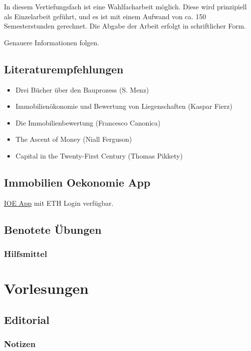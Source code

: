\documentclass[11pt]{article}
\begin{document}
In diesem Vertiefungsfach ist eine Wahlfacharbeit möglich. Diese wird
prinzipiell als Einzelarbeit geführt, und es ist mit einem Aufwand von
ca. 150 Semesterstunden gerechnet. Die Abgabe der Arbeit erfolgt in
schriftlicher Form.

Genauere Informationen folgen.

\subsection{Literaturempfehlungen}
\label{sec-1-3}

\begin{itemize}
\item Drei Bücher über den Bauprozess (S. Menz)
\item Immobilienökonomie und Bewertung von Liegenschaften (Kaspar Fierz)
\item Die Immobilienbewertung (Francesco Canonica)
\item The Ascent of Money (Niall Ferguson)
\item Capital in the Twenty-First Century (Thomas Pikkety)
\end{itemize}

\subsection{Immobilien Oekonomie App}
\label{sec-1-4}

\href{https://ioe-app.ethz.ch}{IOE App} mit ETH Login verfügbar.

\subsection{Benotete Übungen}
\label{sec-1-5}

\subsubsection{Hilfsmittel}
\label{sec-1-5-1}



\section{Vorlesungen}
\label{sec-2}

\subsection{Editorial}
\label{sec-2-1}

\subsubsection{Notizen}
\label{sec-2-1-1}
\end{document}
